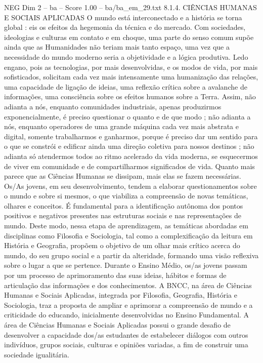\begin{textsample}{NEG Dim 2 – ba – Score 1.00 – ba/ba\_em\_29.txt}  \label{ex:f2_neg_258}
8.1.4.
CIÊNCIAS HUMANAS E SOCIAIS APLICADAS O mundo está interconectado e a história se torna global : eis os efeitos da hegemonia da técnica e do mercado.
Com sociedades, ideologias e culturas em contato e em choque, uma parte do senso comum supõe ainda que as Humanidades não teriam mais tanto espaço, uma vez que a necessidade do mundo moderno seria a objetividade e a lógica produtiva.
Ledo engano, pois as tecnologias, por mais desenvolvidas, e os modos de vida, por mais sofisticados, solicitam cada vez mais intensamente uma humanização das relações, uma capacidade de ligação de ideias, uma reflexão crítica sobre a avalanche de informações, uma consciência sobre os efeitos humanos sobre a Terra.
Assim, não adianta a nós, enquanto comunidades industriais, apenas produzirmos exponencialmente, é preciso questionar o quanto e de que modo ; não adianta a nós, enquanto operadores de uma grande máquina cada vez mais abstrata e digital, somente trabalharmos e ganharmos, porque é preciso dar um sentido para o que se constrói e edificar ainda uma direção coletiva para nossos destinos ; não adianta só atendermos todos ao ritmo acelerado da vida moderna, se esquecermos de viver em comunidade e de compartilharmos significados de vida.
Quanto mais parece que as Ciências Humanas se dissipam, mais elas se fazem necessárias.
Os/As jovens, em seu desenvolvimento, tendem a elaborar questionamentos sobre o mundo e sobre si mesmos, o que viabiliza a compreensão de novas temáticas, olhares e conceitos.
É fundamental para a identificação autônoma dos pontos positivos e negativos presentes nas estruturas sociais e nas representações de mundo.
Deste modo, nessa etapa de aprendizagem, as temáticas abordadas em disciplinas como Filosofia e Sociologia, tal como a complexificação da leitura em História e Geografia, propõem o objetivo de um olhar mais crítico acerca do mundo, do seu grupo social e a partir da alteridade, formando uma visão reflexiva sobre o lugar a que se pertence.
Durante o Ensino Médio, os/as jovens passam por um processo de aprimoramento das suas ideias, hábitos e formas de articulação das informações e dos conhecimentos.
A BNCC, na área de Ciências Humanas e Sociais Aplicadas, integrada por Filosofia, Geografia, História e Sociologia, traz a proposta de ampliar e aprimorar a compreensão de mundo e a criticidade do educando, inicialmente desenvolvidas no Ensino Fundamental.
A área de Ciências Humanas e Sociais Aplicadas possui o grande desafio de desenvolver a capacidade dos/as estudantes de estabelecer diálogos com outros indivíduos, grupos sociais, culturas e opiniões variadas, a fim de construir uma sociedade igualitária.

\end{textsample}
